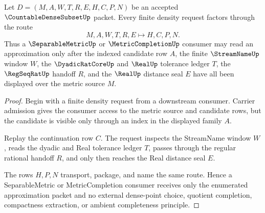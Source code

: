\begin{theorem}
\label{thm:countable-dense-subset-enumerated-approximation-handoff}
Let $D=(M,A,W,T,R,E,H,C,P,N)$ be an accepted $\CountableDenseSubsetUp$ packet. Every finite density request factors through the route
$$
M,A,W,T,R,E \longmapsto H,C,P,N .
$$
Thus a $\SeparableMetricUp$ or $\MetricCompletionUp$ consumer may read an approximation only after the indexed candidate row $A$, the finite $\StreamNameUp$ window $W$, the $\DyadicRatCoreUp$ and $\RealUp$ tolerance ledger $T$, the $\RegSeqRatUp$ handoff $R$, and the $\RealUp$ distance seal $E$ have all been displayed over the metric source $M$.
\end{theorem}
\begin{proof}
Begin with a finite density request from a downstream consumer. Carrier admission gives the consumer access to the metric source and candidate rows, but the candidate is visible only through an index in the displayed family $A$.

Replay the continuation row $C$. The request inspects the StreamName window $W$, reads the dyadic and Real tolerance ledger $T$, passes through the regular rational handoff $R$, and only then reaches the Real distance seal $E$.

The rows $H,P,N$ transport, package, and name the same route. Hence a SeparableMetric or MetricCompletion consumer receives only the enumerated approximation packet and no external dense-point choice, quotient completion, compactness extraction, or ambient completeness principle.
\end{proof}

\begin{closurestatus}{\CountableDenseSubsetUp}
  \theoryclosure{\seedClosure}
  \formalstatus{\unformalizedV}
\end{closurestatus}
